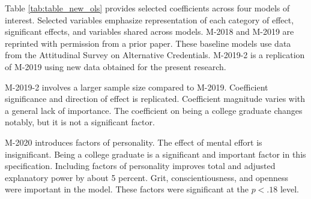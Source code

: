 \documentclass[review]{elsarticle}
\begin{document}



Table \ref{tab:table_new_ols} provides selected coefficients across four models of interest.
Selected variables emphasize representation of each category of effect,
significant effects,
and variables shared across models.
M-2018 and M-2019 are reprinted with permission from a prior paper.
These baseline models use data from the Attitudinal Survey on Alternative Credentials\cite{vandivier2020preliminary}.
M-2019-2 is a replication of M-2019 using new data obtained for the present research.

M-2019-2 involves a larger sample size compared to M-2019.
Coefficient significance and direction of effect is replicated.
Coefficient magnitude varies with a general lack of importance.
The coefficient on being a college graduate changes notably, but it is not a significant factor.

M-2020 introduces factors of personality.
The effect of mental effort is insignificant.
Being a college graduate is a significant and important factor in this specification.
Including factors of personality improves total and adjusted explanatory power by about 5 percent.
Grit, conscientiousness, and openness were important in the model.
These factors were significant at the $p<.18$ level.
\end{document}
